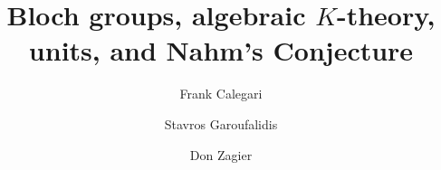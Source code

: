 \documentclass[12pt,reqno]{amsart}
\theoremstyle{definition}
\begin{document}

\title[Bloch groups, algebraic $K$-theory, units, and Nahm's Conjecture]{
Bloch groups, algebraic $K$-theory, \\ units, and Nahm's Conjecture}
\author{Frank Calegari}
\address{Department of Mathematics \\
        University of Chicago \\
        Chicago, IL 60637, USA \newline
        {\tt \url{http://math.uchicago.edu/~fcale}}
        }
\author{Stavros Garoufalidis}
\address{%
  International Center for Mathematics, Department of Mathematics \\
  Southern University of Science and Technology \\
  Shenzhen, China \newline
  {\tt \url{http://people.mpim-bonn.mpg.de/stavros}}}
\author{Don Zagier}
\address{Max Planck Institute for Mathematics \\
  Bonn, Germany and
International Centre for Theoretical Physics \\ Trieste, Italy
  \newline
         {\tt \url{http://people.mpim-bonn.mpg.de/zagier}}
       }
%
\end{document}
